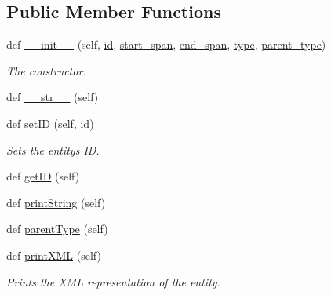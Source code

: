 \subsection*{Public Member Functions}
\begin{DoxyCompactItemize}
\item 
def \hyperlink{classtask6_1_1t6Entities_1_1t6Entity_ac0bcf8dbefa28c8e1a77d891e368c9e1}{\+\_\+\+\_\+init\+\_\+\+\_\+} (self, \hyperlink{classtask6_1_1t6Entities_1_1t6Entity_a96b2e7fb553c920ab2db6f6deb31e3b4}{id}, \hyperlink{classtask6_1_1t6Entities_1_1t6Entity_a8221c36d2995a24200cdfbd74cc9233c}{start\+\_\+span}, \hyperlink{classtask6_1_1t6Entities_1_1t6Entity_a597d42bb02fc9f42277098f0ce21917c}{end\+\_\+span}, \hyperlink{classtask6_1_1t6Entities_1_1t6Entity_af0496eb852234bb168ab22d031c99ed3}{type}, \hyperlink{classtask6_1_1t6Entities_1_1t6Entity_a18ba365facb8cb062830abb11cf741f6}{parent\+\_\+type})
\begin{DoxyCompactList}\small\item\em The constructor. \end{DoxyCompactList}\item 
def \hyperlink{classtask6_1_1t6Entities_1_1t6Entity_a60cd3a7b64d13bbacb877267fa0151fe}{\+\_\+\+\_\+str\+\_\+\+\_\+} (self)
\item 
def \hyperlink{classtask6_1_1t6Entities_1_1t6Entity_a5387d85b2aa40e213b9962470207bd09}{set\+ID} (self, \hyperlink{classtask6_1_1t6Entities_1_1t6Entity_a96b2e7fb553c920ab2db6f6deb31e3b4}{id})
\begin{DoxyCompactList}\small\item\em Sets the entity\textquotesingle{}s ID. \end{DoxyCompactList}\item 
def \hyperlink{classtask6_1_1t6Entities_1_1t6Entity_aadb42e2b65a301043fb6162e4f14edd7}{get\+ID} (self)
\item 
def \hyperlink{classtask6_1_1t6Entities_1_1t6Entity_ae24a589eee8e89e5cc9d2116a05f574c}{print\+String} (self)
\item 
def \hyperlink{classtask6_1_1t6Entities_1_1t6Entity_ad72f67fab17e07055b34d77834174f75}{parent\+Type} (self)
\item 
def \hyperlink{classtask6_1_1t6Entities_1_1t6Entity_acd1af6b899f68fec07c9749e5d0129fa}{print\+X\+ML} (self)
\begin{DoxyCompactList}\small\item\em Prints the X\+ML representation of the entity. \end{DoxyCompactList}\end{DoxyCompactItemize}
